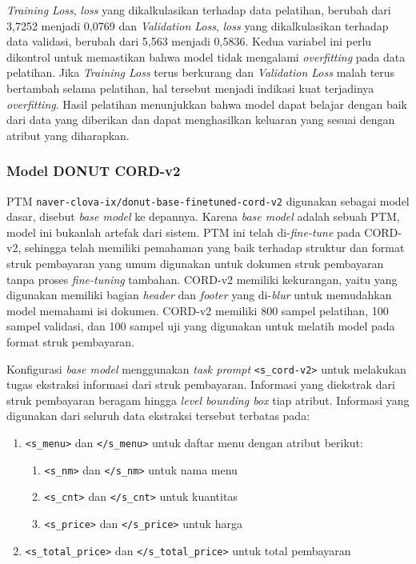 \emph{Training Loss}, \emph{loss} yang dikalkulasikan terhadap data pelatihan, berubah dari 3,7252 menjadi 0,0769 dan \emph{Validation Loss}, \emph{loss} yang dikalkulasikan terhadap data validasi, berubah dari 5,563 menjadi 0,5836. Kedua variabel ini perlu dikontrol untuk memastikan bahwa model tidak mengalami \emph{overfitting} pada data pelatihan. Jika \emph{Training Loss} terus berkurang dan \emph{Validation Loss} malah terus bertambah selama pelatihan, hal tersebut menjadi indikasi kuat terjadinya \emph{overfitting}. Hasil pelatihan menunjukkan bahwa model dapat belajar dengan baik dari data yang diberikan dan dapat menghasilkan keluaran yang sesuai dengan atribut yang diharapkan.

\subsubsection{Model DONUT CORD-v2}
\label{subsubsec:model-base}

PTM \donut{} \texttt{naver-clova-ix/donut-base-finetuned-cord-v2} digunakan sebagai model dasar, disebut \emph{base model} ke depannya. Karena \emph{base model} adalah sebuah PTM, model ini bukanlah artefak dari sistem. PTM ini telah di-\emph{fine-tune} pada \dataset{} CORD-v2, sehingga telah memiliki pemahaman yang baik terhadap struktur dan format struk pembayaran yang umum digunakan untuk dokumen struk pembayaran tanpa proses \emph{fine-tuning} tambahan. \datasetfl{} CORD-v2 memiliki kekurangan, yaitu \dataset{} yang digunakan memiliki bagian \emph{header} dan \emph{footer} yang di-\emph{blur} untuk memudahkan model memahami isi dokumen. \datasetfl{} CORD-v2 memiliki 800 sampel pelatihan, 100 sampel validasi, dan 100 sampel uji yang digunakan untuk melatih model \donut{} pada format struk pembayaran.

Konfigurasi \emph{base model} menggunakan \emph{task prompt} \texttt{<s\_cord-v2>} untuk melakukan tugas ekstraksi informasi dari struk pembayaran. Informasi yang diekstrak dari struk pembayaran beragam hingga \emph{level bounding box} tiap atribut. Informasi yang digunakan dari seluruh data ekstraksi tersebut terbatas pada:
\begin{enumerate}
    \item \texttt{<s\_menu>} dan \texttt{</s\_menu>} untuk daftar menu dengan atribut berikut:
    \begin{enumerate}
        \item \texttt{<s\_nm>} dan \texttt{</s\_nm>} untuk nama menu
        \item \texttt{<s\_cnt>} dan \texttt{</s\_cnt>} untuk kuantitas
        \item \texttt{<s\_price>} dan \texttt{</s\_price>} untuk harga
    \end{enumerate}
    \item \texttt{<s\_total\_price>} dan \texttt{</s\_total\_price>} untuk total pembayaran
\end{enumerate}

